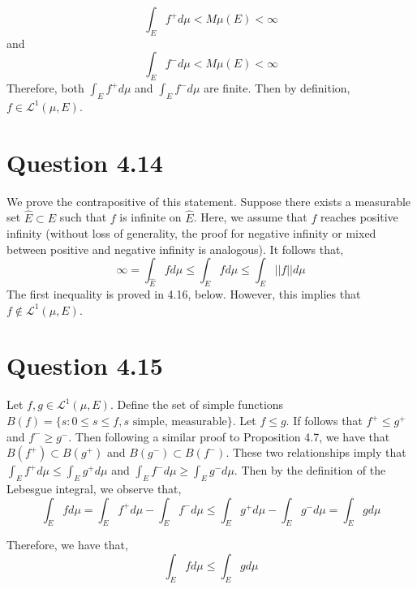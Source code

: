 \documentclass{article}
\begin{document}
     $$ \int_E f^+ d\mu < M \mu(E) < \infty $$ and
     $$
      \int_E f^- d\mu < M \mu(E) < \infty $$
\newline
      Therefore, both $\int_E f^+ d\mu$ and $\int_E f^- d\mu$ are finite. Then by definition, $f \in \mathscr{L}^1(\mu, E)$.

      \section*{Question 4.14}
  We prove the contrapositive of this statement. Suppose there exists a measurable set $\hat{E} \subset E$ such that $f$ is infinite on $\hat{E}$. Here, we assume that $f$ reaches positive infinity (without loss of generality, the proof for negative infinity or mixed between positive and negative infinity is analogous). It follows that,
  \begin{equation}
  	\infty = \int_{\hat{E}} f d\mu \leq \int_E f d\mu \leq \int_E ||f|| d\mu
  \end{equation}
  The first inequality is proved in 4.16, below. However, this implies that $f \not\in \mathscr{L}^1(\mu,E)$.

  \section*{Question 4.15}
  Let $f,g \in \mathscr{L}^1(\mu,E)$. Define the set of simple functions $B(f) = \{ s : 0 \leq s \leq f, s \text{ simple, measurable}  \}$. Let $f \leq g$. If follows that $f^+ \leq g^+$ and $f^- \geq g^-$. Then following a similar proof to Proposition 4.7, we have that $B(f^+) \subset B(g^+)$ and $B(g^-) \subset B(f^-)$.
  \newline
\newline
  These two relationships imply that $ \int_E f^+ d\mu \leq \int_E g^+ d\mu$ and $\int_E f^- d\mu \geq \int_E g^- d\mu$. Then by the definition of the Lebesgue integral, we observe that,
  \begin{equation}
  	\int_E fd\mu = \int_E f^+ d\mu - \int_E f^- d\mu \leq \int_E g^+ d\mu - \int_E g^- d\mu = \int_E g d\mu
  \end{equation}
  \newline

  Therefore, we have that,
  \begin{equation}
  	\int_E fd\mu \leq \int_E g d\mu
  \end{equation}
\end{document}
